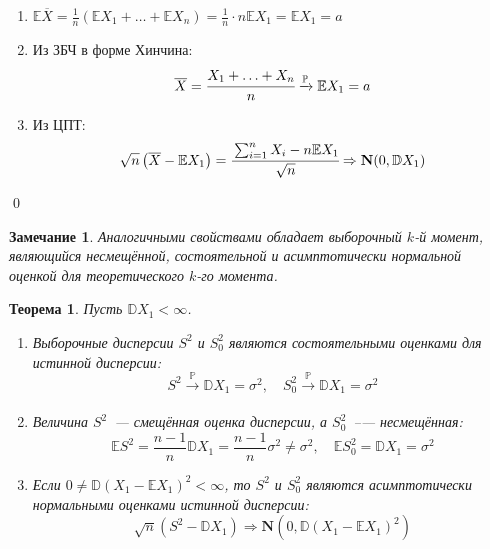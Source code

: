 \documentclass[oneside,final,14pt]{extreport}
\renewenvironment{proof}{{\bfseries Доказательство.}}{\qed}
\newtheorem{thm}{Теорема}[section]
\newtheorem*{rmrk}{Замечание}
\theoremstyle{definition}
\begin{document}
\begin{proof}
\begin{enumerate}[label={\arabic*.}]
    \item $\mathbb{E} \overline{X}=\frac{1}{n}(\mathbb{E} X_{1}+\ldots+\mathbb{E} X_{n})=\frac{1}{n} \cdot n \mathbb{E} X_{1}=\mathbb{E} X_{1}=a$
    \item Из ЗБЧ в форме Хинчина:
    \begin{equation*}
        \overline{X}
        = \cfrac{X_{1}+\ldots+X_{n}}{n} \xrightarrow[]{\mathbb{P}} \mathbb{E} X_{1} 
        = a
    \end{equation*}

    \item Из ЦПТ:
    \begin{equation*}
        \sqrt{n}\left(\overline{X}-\mathbb{E} X_{1}\right) 
        = \cfrac{\sum_{i=1}^{n} X_{i}-n \mathbb{E} X_{1}}{\sqrt{n}} 
        \Rightarrow \mathbf{N}(0, \mathbb{D} X_{1})
    \end{equation*}
\end{enumerate}
\end{proof}

\begin{rmrk}
    Аналогичными свойствами обладает выборочный $k$-й момент, являющийся несмещённой, состоятельной и асимптотически нормальной оценкой для теоретического $k$-го момента.
\end{rmrk}

\begin{thm}
Пусть $\mathbb{D} X_{1}<\infty$.
\begin{enumerate}
    \item Выборочные дисперсии $S^{2}$ и $S^{2}_0$ являются состоятельными оценками для истинной дисперсии:
    \begin{equation*}
        S^{2} \xrightarrow[]{\mathbb{P}} \mathbb{D} X_{1}=\sigma^{2}, \quad S_{0}^{2} \xrightarrow[]{\mathbb{P}} \mathbb{D} X_{1}=\sigma^{2}
    \end{equation*}
    \item Величина $S^{2}$~--- смещённая оценка дисперсии, а $S^{2}_0$~--— несмещённая:
    \begin{equation*}
        \mathbb{E} S^{2}=\frac{n-1}{n} \mathbb{D} X_{1}=\frac{n-1}{n} \sigma^{2} \neq \sigma^{2}, \quad \mathbb{E} S_{0}^{2}=\mathbb{D} X_{1}=\sigma^{2}
    \end{equation*}
    
    \item Если $0 \neq \mathbb{D}(X_{1}-\mathbb{E}X_{1})^{2}<\infty$, то $S^{2}$ и $S^{2}_0$ являются асимптотически нормальными оценками истинной дисперсии:
    \begin{equation*}
        \sqrt{n}\left(S^{2}-\mathbb{D} X_{1}\right) \Rightarrow \mathbf{N}(0, \mathbb{D}(X_{1}-\mathbb{E} X_{1})^{2})
    \end{equation*}
\end{enumerate}
\end{thm}
\end{document}
